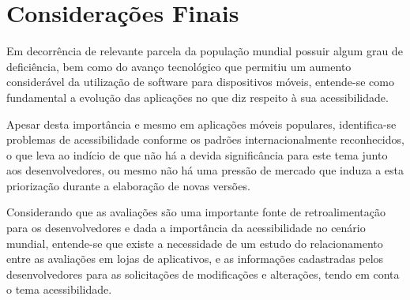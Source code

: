 \section{Considerações Finais}
Em decorrência de relevante parcela da população mundial possuir algum grau de deficiência, bem como do avanço tecnológico que permitiu um aumento considerável da utilização de software para dispositivos móveis, entende-se como fundamental a evolução das aplicações no que diz respeito à sua acessibilidade.

Apesar desta importância e mesmo em aplicações móveis populares, identifica-se problemas de acessibilidade conforme os padrões internacionalmente reconhecidos, o que leva ao indício de que não há a devida significância para este tema junto aos desenvolvedores, ou mesmo não há uma pressão de mercado que induza a esta priorização durante a elaboração de novas versões.

Considerando que as avaliações são uma importante fonte de retroalimentação para os desenvolvedores e dada a importância da acessibilidade no cenário mundial, entende-se que existe a necessidade de um estudo do relacionamento entre as avaliações em lojas de aplicativos, e as informações cadastradas pelos desenvolvedores para as solicitações de modificações e alterações, tendo em conta o tema acessibilidade.
